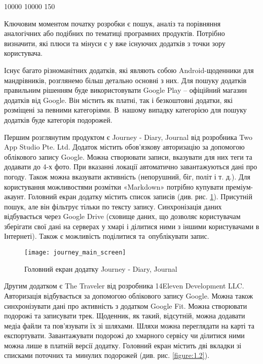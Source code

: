 \documentclass[../main.tex]{subfiles}
\begin{document}
{

 10000 10000 150 %

Ключовим моментом початку розробки є пошук, аналіз та порівняння аналогічних або подібних по тематиці програмних продуктів. Потрібно визначити, які плюси та мінуси є у вже існуючих додатків з точки зору користувача.

Існує багато різноманітних додатків, які являють собою Android-щоденники для мандрівників, розглянемо більш детально основні з них. Для пошуку додатків правильним рішенням буде використовувати Google Play -- офіційний магазин додатків від Google. Він містить як платні, так і безкоштовні додатки, які розміщені за певними категоріями. В~нашому випадку категорією для пошуку додатків буде категорія подорожей.

Першим розглянутим продуктом є Journey - Diary, Journal від розробника Two App Studio Pte. Ltd. Додаток містить обов'язкову авторизацію за допомогою облікового запису Google. Можна створювати записи, вказувати для них теги та додавати до 4-х фото. При вказанні локації автоматично завантажуються дані про погоду. Також можна вказувати активність (непорушний, біг, політ і т. д.). Для користування можливостями розмітки «Markdown» потрібно купувати преміум-акаунт. Головний екран додатку містить список записів (див. рис. \ref{figure:1.1}). Присутній пошук, але він фільтрує тільки по тексту запису. Синхронізація даних відбувається через Google Drive (сховище даних, що дозволяє користувачам зберігати свої дані на серверах у хмарі і ділитися ними з іншими користувачами в Інтернеті). Також є можливість поділитися та~опублікувати запис. 

\begin{figure}[H]
\centering
\texttt{[image: journey\_main\_screen]}
\caption{Головний екран додатку Journey - Diary, Journal}
\label{figure:1.1}
\end{figure}

Другим додатком є The Traveler від розробника 14Eleven Development LLC. Авторизація відбувається за допомогою облікового запису Google. Можна також синхронізувати дані про активність з додатком Google Fit. Можна створювати подорожі та записувати трек. Щоденник, як такий, відсутній, можна додавати медіа файли та пов'язувати їх зі шляхами. Шляхи можна переглядати на карті та експортувати. Завантажувати подорожі до хмарного сервісу чи ділитися ними можна лише в платній версії додатку. Головний екран містить дві вкладки зі списками поточних та~минулих подорожей (див. рис. \ref{figure:1.2}). 

}
\end{document}
